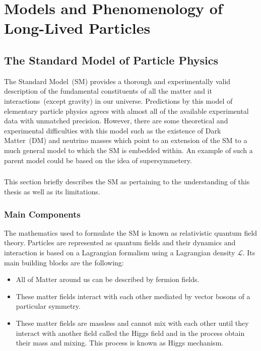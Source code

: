 
\chapter{Models and Phenomenology of Long-Lived Particles}
\label{Long_Lived_Particle_physics_chapter}


\section{The Standard Model of Particle Physics}
The Standard Model~(SM) provides a thorough and experimentally valid description of the fundamental constituents of all the matter and it interactions~(except gravity) in our universe. Predictions by this model of elementary particle physics agrees  with almost all of the available experimental data with unmatched precision.
However, there are some theoretical and experimental difficulties with this model such as the existence of Dark Matter~(DM) and neutrino masses which point to an extension of the SM to a much general model to which the SM is embedded within. An example of such  a parent model could be based on the idea of supersymmetery.
\paragraph{}
This section briefly describes the SM as pertaining to the understanding of this thesis as well as its limitations.
\subsection{Main Components}
The mathematics used to formulate the SM is known as relativistic quantum field theory. Particles are represented as quantum fields and their dynamics and interaction is based on a Lagrangian formalism using a Lagrangian density $\mathcal{L}$. Its main building blocks are the following:

\begin{itemize}
\item All of Matter around us can be described by fermion fields.
\item These matter fields interact with each other mediated by vector bosons of a particular symmetry.
\item These matter fields are massless and cannot mix with each other until they interact with another field called the Higgs field and in the process obtain their mass and mixing. This process is known as Higgs mechanism.

\end{itemize}
